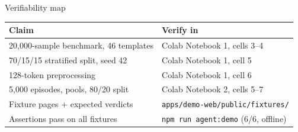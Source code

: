 \documentclass[aspectratio=169]{beamer}
\begin{document}
\begin{frame}{Verifiability map}
\begin{center}
\footnotesize
\begin{tabular}{@{}ll@{}}
\toprule
\textbf{Claim} & \textbf{Verify in} \\
\midrule
20{,}000-sample benchmark, 46 templates & Colab Notebook 1, cells 3--4 \\
70/15/15 stratified split, seed 42 & Colab Notebook 1, cell 5 \\
128-token preprocessing & Colab Notebook 1, cell 6 \\
5{,}000 episodes, pools, 80/20 split & Colab Notebook 2, cells 5--7 \\
Fixture pages + expected verdicts & \texttt{apps/demo-web/public/fixtures/} \\
Assertions pass on all fixtures & \texttt{npm run agent:demo} (6/6, offline) \\
\bottomrule
\end{tabular}
\end{center}
\end{frame}
\end{document}
